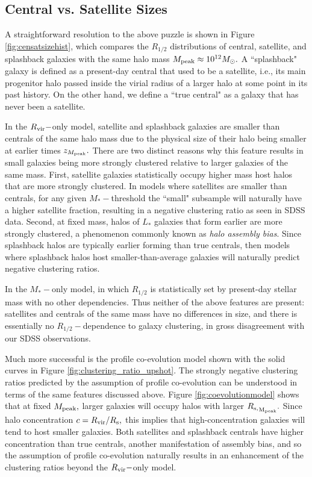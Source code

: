 \documentclass[usenatbib,usegraphicx,letterpaper]{mn2e}
\newcommand{\rhalf}{R_{1/2}}
\newcommand{\mstar}{M_{\ast}}
\newcommand{\mpeak}{M_{\rm peak}}
\newcommand{\zpeak}{z_{M_{\rm peak}}}
\newcommand{\rvir}{R_{\rm vir}}
\newcommand{\rspeak}{{R_{\rm s,}}_{\rm M_{peak}}}
\newcommand{\msun}{M_\odot}
\begin{document}
\subsection{Central vs. Satellite Sizes}
\label{subsec:censat_sizes}

A straightforward resolution to the above puzzle is shown in Figure \ref{fig:censatsizehist}, which compares the $\rhalf$ distributions of central, satellite, and splashback galaxies with the same halo mass $\mpeak\approx10^{12}\msun.$ A ``splashback" galaxy is defined as a present-day central that used to be a satellite, i.e., its main progenitor halo passed inside the virial radius of a larger halo at some point in its past history. On the other hand, we define a ``true central" as a galaxy that has never been a satellite.

In the $\rvir-$only model, satellite and splashback galaxies are smaller than centrals of the same halo mass due to the physical size of their halo being smaller at earlier times $\zpeak.$ There are two distinct reasons why this feature results in small galaxies being more strongly clustered relative to larger galaxies of the same mass. First, satellite galaxies statistically occupy higher mass host halos that are more strongly clustered. In models where satellites are smaller than centrals, for any given $\mstar-$threshold the ``small" subsample will naturally have a higher satellite fraction, resulting in a negative clustering ratio as seen in SDSS data. Second, at fixed mass, halos of $L_\ast$ galaxies that form earlier are more strongly clustered, a phenomenon commonly known as {\em halo assembly bias}. Since splashback halos are typically earlier forming than true centrals, then models where splashback halos host smaller-than-average galaxies will naturally predict negative clustering ratios.

In the $\mstar-$only model, in which $\rhalf$ is statistically set by present-day stellar mass with no other dependencies. Thus neither of the above features are present: satellites and centrals of the same mass have no differences in size, and there is essentially no $\rhalf-$dependence to galaxy clustering, in gross disagreement with our SDSS observations.

Much more successful is the profile co-evolution model shown with the solid curves in Figure \ref{fig:clustering_ratio_upshot}. The strongly negative clustering ratios predicted by the assumption of profile co-evolution can be understood in terms of the same features discussed above. Figure \ref{fig:coevolutionmodel} shows that at fixed $\mpeak,$ larger galaxies will occupy halos with larger $\rspeak.$ Since halo concentration $c=\rvir/R_{\rm s},$ this implies that high-concentration galaxies will tend to host smaller galaxies. Both satellites and splashback centrals have higher concentration than true centrals, another manifestation of assembly bias, and so the assumption of profile co-evolution naturally results in an enhancement of the clustering ratios beyond the $\rvir-$only model.
\end{document}
